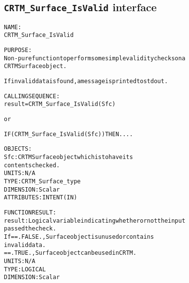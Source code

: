 \subsection{\texttt{CRTM\_Surface\_IsValid} interface}
  \label{sec:CRTM_Surface_IsValid_interface}
  \begin{alltt}
 
  NAME:
        CRTM_Surface_IsValid
 
  PURPOSE:
        Non-pure function to perform some simple validity checks on a
        CRTM Surface object.
 
        If invalid data is found, a message is printed to stdout.
 
  CALLING SEQUENCE:
        result = CRTM_Surface_IsValid( Sfc )
 
          or
 
        IF ( CRTM_Surface_IsValid( Sfc ) ) THEN....
 
  OBJECTS:
        Sfc:       CRTM Surface object which is to have its
                   contents checked.
                   UNITS:      N/A
                   TYPE:       CRTM_Surface_type
                   DIMENSION:  Scalar
                   ATTRIBUTES: INTENT(IN)
 
  FUNCTION RESULT:
        result:    Logical variable indicating whether or not the input
                   passed the check.
                   If == .FALSE., Surface object is unused or contains
                                  invalid data.
                      == .TRUE.,  Surface object can be used in CRTM.
                   UNITS:      N/A
                   TYPE:       LOGICAL
                   DIMENSION:  Scalar
 
  \end{alltt}

